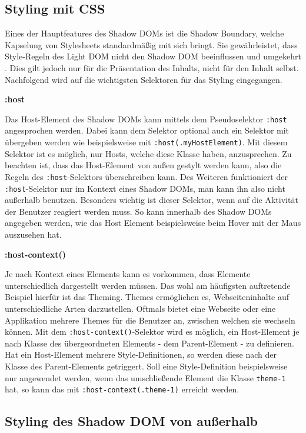 \subsection{Styling mit CSS}\label{styling-mit-css}

Eines der Hauptfeatures des Shadow DOMs ist die Shadow Boundary, welche Kapselung von Stylesheets standardmäßig mit sich bringt. Sie gewährleistet, dass Style-Regeln des Light DOM nicht den Shadow DOM beeinflussen und umgekehrt \cite{citeulike:13851334}. Dies gilt jedoch nur für die Präsentation des Inhalts, nicht für den Inhalt selbst. Nachfolgend wird auf die wichtigsten Selektoren für das Styling eingegangen.

\textbf{:host}

Das Host-Element des Shadow DOMs kann mittels dem Pseudoselektor \texttt{:host} angesprochen werden. Dabei kann dem Selektor optional auch ein Selektor mit übergeben werden wie beispielsweise mit \texttt{:host(.myHostElement)}. Mit diesem Selektor ist es möglich, nur Hosts, welche diese Klasse haben, anzusprechen. Zu beachten ist, dass das Host-Element von außen gestylt werden kann, also die Regeln des \texttt{:host}-Selektors überschreiben kann. Des Weiteren funktioniert der \texttt{:host}-Selektor nur im Kontext eines Shadow DOMs, man kann ihn also nicht außerhalb benutzen. Besonders wichtig ist dieser Selektor, wenn auf die Aktivität der Benutzer reagiert werden muss. So kann innerhalb des Shadow DOMs angegeben werden, wie das Host Element beispielsweise beim Hover mit der Maus auszusehen hat.

\textbf{:host-context()}

Je nach Kontext eines Elements kann es vorkommen, dass Elemente unterschiedlich dargestellt werden müssen. Das wohl am häufigsten auftretende Beispiel hierfür ist das Theming. Themes ermöglichen es, Webseiteninhalte auf unterschiedliche Arten darzustellen. Oftmals bietet eine Webseite oder eine Applikation mehrere Themes für die Benutzer an, zwischen welchen sie wechseln können. Mit dem \texttt{:host-context()}-Selektor wird es möglich, ein Host-Element je nach Klasse des übergeordneten Elements - dem Parent-Element - zu definieren. Hat ein Host-Element mehrere Style-Definitionen, so werden diese nach der Klasse des Parent-Elements getriggert. Soll eine Style-Definition beispielsweise nur angewendet werden, wenn das umschließende Element die Klasse \texttt{theme-1} hat, so kann das mit \texttt{:host-context(.theme-1)} erreicht werden.

\subsection{Styling des Shadow DOM von außerhalb}\label{styling-des-shadow-dom-von-ausserhalb}

